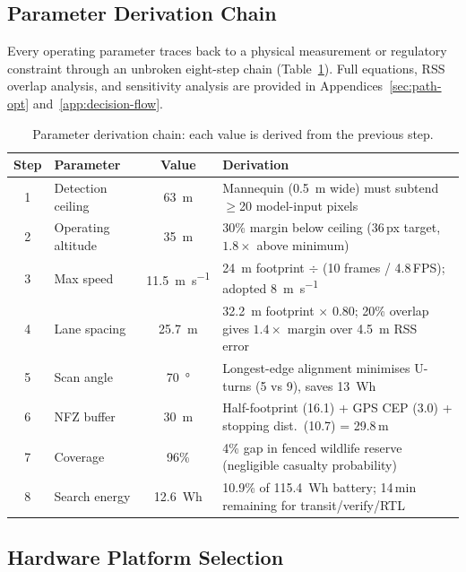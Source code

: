 \subsection{Parameter Derivation Chain}\label{sec:param-chain}

Every operating parameter traces back to a physical measurement or regulatory constraint through an unbroken eight-step chain (Table~\ref{tab:param-chain}). Full equations, RSS overlap analysis, and sensitivity analysis are provided in Appendices~\ref{sec:path-opt} and~\ref{app:decision-flow}.

\begin{table}[H]
  \centering\compactTable
  \caption{Parameter derivation chain: each value is derived from the previous step.}\label{tab:param-chain}
  \begin{tabularx}{\linewidth}{@{}c l c X@{}}
    \toprule
    \textbf{Step} & \textbf{Parameter} & \textbf{Value} & \textbf{Derivation} \\
    \midrule
    1 & Detection ceiling & \SI{63}{\metre} & Mannequin (\SI{0.5}{\metre} wide) must subtend $\geq$20 model-input pixels \\
    2 & Operating altitude & \SI{35}{\metre} & 30\% margin below ceiling (36\,px target, $1.8\times$ above minimum) \\
    3 & Max speed & \SI{11.5}{\metre\per\second} & \SI{24}{\metre} footprint $\div$ (10 frames / 4.8\,FPS); adopted \SI{8}{\metre\per\second} \\
    4 & Lane spacing & \SI{25.7}{\metre} & \SI{32.2}{\metre} footprint $\times$ 0.80; 20\% overlap gives $1.4\times$ margin over \SI{4.5}{\metre} RSS error~\cite{galceran2013survey, choset2001coverage} \\
    5 & Scan angle & \SI{70}{\degree} & Longest-edge alignment minimises U-turns (5 vs 9), saves \SI{13}{Wh} \\
    6 & NFZ buffer & \SI{30}{\metre} & Half-footprint (16.1) + GPS CEP (3.0) + stopping dist.\ (10.7) = 29.8\,m~\cite{wca1981} \\
    7 & Coverage & 96\% & 4\% gap in fenced wildlife reserve (negligible casualty probability) \\
    8 & Search energy & \SI{12.6}{Wh} & 10.9\% of \SI{115.4}{Wh} battery; 14\,min remaining for transit/verify/RTL \\
    \bottomrule
  \end{tabularx}
\end{table}

\subsection{Hardware Platform Selection}\label{sec:hw-rationale}

